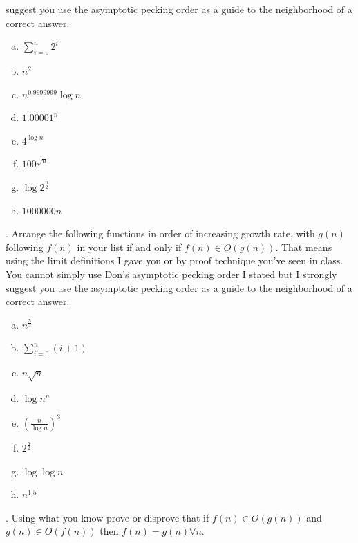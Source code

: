 \documentclass[12pt]{article}
\begin{document}
suggest you use the asymptotic pecking order as a guide to the neighborhood of a correct answer.\\
\begin{enumerate}[a)]
\item $\sum\limits_{i = 0}^{n} 2^i$\\
\item $n^2$\\
\item $n^{0.9999999}\log{n}$\\
\item $1.00001^n$\\
\item $4^{\log{n}}$\\
\item $100^{\sqrt{n}}$\\
\item $\log{2^{\frac{n}{2}}}$\\
\item $1000000n$\\
\end{enumerate}
\newpage
{}. Arrange the following functions in order of increasing growth rate, with $g(n)$ following $f(n)$ in your list if and only if $f(n) \in O(g(n))$. That means using the limit definitions I gave you or by proof technique you've seen in class. You cannot simply use Don's asymptotic pecking order I stated but I strongly suggest you use the asymptotic pecking order as a guide to the neighborhood of a correct answer.\\
\begin{enumerate}[a)]
\item  $n^{\frac{5}{3}}$\\
\item $\sum\limits_{i = 0}^{n} (i + 1)$\\
\item $n\sqrt{n}$\\
\item $\log{n^n}$\\
\item $(\frac{n}{\log{n}})^3$\\
\item  $2^{\frac{n}{2}}$\\
\item  $\log{\log{n}}$\\
\item  $n^{1.5}$\\
\end{enumerate}
\newpage
{}. Using what you know prove or disprove that  if $f(n) \in O(g(n)) $ and $g(n) \in O(f(n))$ then $f(n) = g(n) \forall n$.
\end{document}
